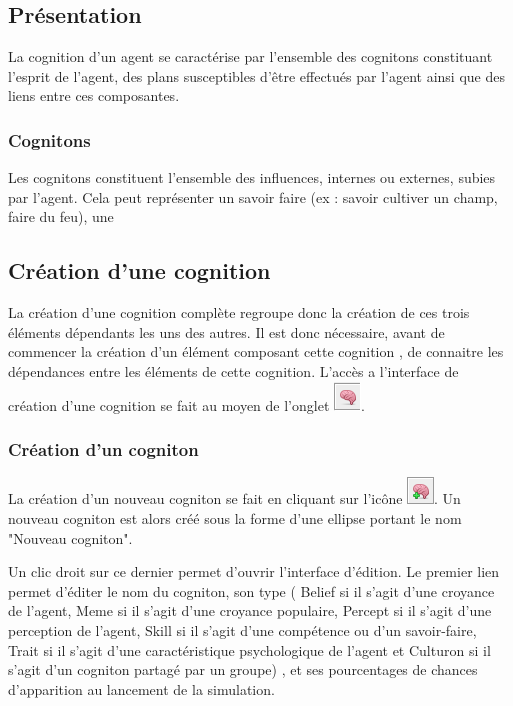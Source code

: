 \subsection{Présentation}

	La cognition d'un agent se caractérise par l'ensemble des cognitons constituant l'esprit de l'agent, des plans susceptibles d'être effectués par l'agent ainsi que des liens entre ces composantes. 

\subsubsection{Cognitons}
	
	Les cognitons constituent l'ensemble des influences, internes ou externes, subies par l'agent. Cela peut représenter un savoir faire (ex : savoir cultiver un champ, faire du feu), une 
	

\subsection{Création d'une cognition}

La création d'une cognition complète regroupe donc la création de ces trois éléments dépendants les uns des autres. Il est donc nécessaire, avant de commencer la création d'un élément composant cette cognition , de connaitre  les dépendances entre les éléments de cette cognition. L'accès a l'interface de création d'une cognition se fait au moyen de l'onglet \includegraphics{images/ongcogni.png}. 

\subsubsection{Création d'un cogniton}

La création d'un nouveau cogniton se fait en cliquant sur l'icône \includegraphics{images/newcogni.png}. Un nouveau cogniton est alors créé sous la forme d'une ellipse portant le nom "Nouveau cogniton". 

Un clic droit sur ce dernier permet d'ouvrir l'interface d'édition. Le premier lien permet d'éditer le nom du cogniton, son type ( Belief si il s'agit d'une croyance de l'agent, Meme si il s'agit d'une croyance populaire, Percept si il s'agit d'une perception de l'agent, Skill si il s'agit d'une compétence ou d'un savoir-faire, Trait si il s'agit d'une caractéristique psychologique de l'agent et Culturon si il s'agit d'un cogniton partagé par un groupe) , et ses pourcentages de chances d'apparition au lancement de la simulation.

